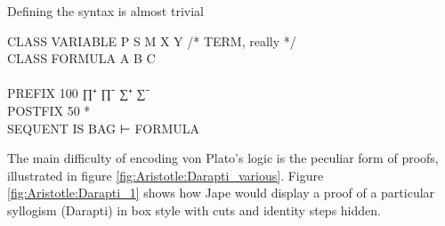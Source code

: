 Defining the syntax is almost trivial
\begin{japeish}
CLASS VARIABLE P S M X Y               /* TERM, really */\\
CLASS FORMULA A B C\\
\\
PREFIX 100 ∏⁺ ∏⁻ ∑⁺ ∑⁻\\
POSTFIX 50 *\\

SEQUENT IS BAG ⊢ FORMULA
\end{japeish}
%
%
%
%
The main difficulty of encoding von Plato's logic is the peculiar form of proofs, illustrated in figure \ref{fig:Aristotle:Darapti_various}. Figure \ref{fig:Aristotle:Darapti_1} shows how Jape would display a proof of a particular syllogism (Darapti) in box style with cuts and identity steps hidden. 
